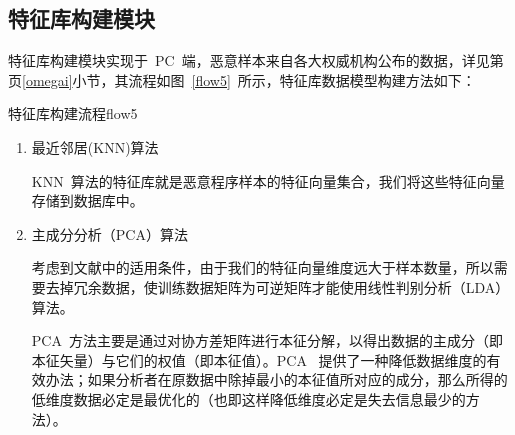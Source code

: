 	\subsection{特征库构建模块}
		 特征库构建模块实现于~PC~端，恶意样本来自各大权威机构公布的数据，详见第\pageref{omegai}页\ref{omegai}小节，其流程如图~\ref{flow5}~所示，特征库数据模型构建方法如下：
		
\begin{pics}[htbp]{特征库构建流程}{flow5}
\end{pics}

		\begin{enumerate}
		\item 最近邻居(KNN)算法\par
		 KNN~算法的特征库就是恶意程序样本的特征向量集合，我们将这些特征向量存储到数据库中。
		
		\item 主成分分析（PCA）算法\par
		 考虑到文献中的适用条件，由于我们的特征向量维度远大于样本数量，所以需要去掉冗余数据，使训练数据矩阵为可逆矩阵才能使用线性判别分析（LDA）算法。

		 PCA~方法主要是通过对协方差矩阵进行本征分解，以得出数据的主成分（即本征矢量）与它们的权值（即本征值）。PCA~ 提供了一种降低数据维度的有效办法；如果分析者在原数据中除掉最小的本征值所对应的成分，那么所得的低维度数据必定是最优化的（也即这样降低维度必定是失去信息最少的方法）。


\end{enumerate}
